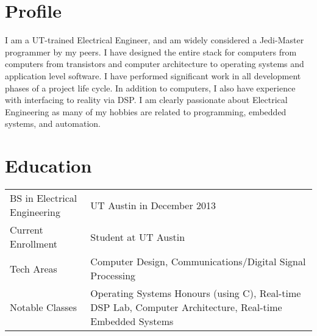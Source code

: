 \documentclass[letterpaper,12pt]{resume}
\begin{document}
\let\olditemize\itemize
\renewcommand{\itemize}{
  \olditemize
  \setlength{\itemsep}{1pt}
  \setlength{\parskip}{0pt}
  \setlength{\parsep}{0pt}
}

\author{James Brisson}
\maketitle

\section{Profile}
\noindent
I am a UT-trained Electrical Engineer, and am widely considered a Jedi-Master programmer by my peers.
I have designed the entire stack for computers from computers from transistors and computer architecture to operating systems and application level software. 
I have performed significant work in all development phases of a project life cycle.
In addition to computers, I also have experience with interfacing to reality via DSP.
I am clearly passionate about Electrical Engineering as many of my hobbies are related to programming, embedded systems, and automation.

\section{Education}
\noindent
\begin{tabular}{p{}p{}}
  BS in Electrical Engineering&
  UT Austin in December 2013\\
  \noalign{\smallskip}
  Current Enrollment&
  Student at UT Austin\\
  \noalign{\smallskip}
  Tech Areas&
  Computer Design, Communications/Digital Signal Processing\\
  \noalign{\smallskip}
  Notable Classes&
  Operating Systems Honours (using C), Real-time DSP Lab, Computer Architecture, Real-time Embedded Systems\\
\end{tabular}
\end{document}
